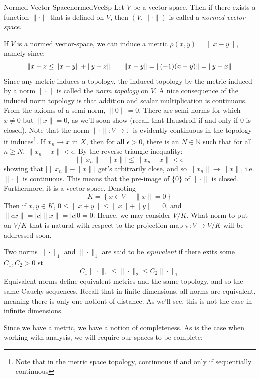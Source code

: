 \documentclass[oneside]{book}
\newcommand{\F}{\mathbb{F}}
\newcommand{\N}{\mathbb{N}}
\newcommand{\rw}{\rightarrow}
\newcommand{\set}[2]{\left\{#1 \ \middle|\ #2\right\}}
\begin{document}
\begin{defn}{Normed Vector-Space}{normedVecSp}
	Let $V$ be a vector space. Then if there exists a function $\|\cdot \|$ that is defined on $V$, then $(V,
	\|\cdot\|)$ is called a \emph{normed vector-space}.
\end{defn}

If $V$ is a normed vector-space, we can induce a metric $\rho(x,y) = \|x-y\|$, namely since:
\[
	\|x-z\\ \le \|x-y\| + \|y-z\| \qquad \|x-y\| = \|(-1)(x-y)\| = \|y-x\|
\]
Since any metric induces a topology, the induced topology by the metric induced by a norm $\|\cdot\|$ is called the
\emph{norm topology} on $V$. A nice consequence of the induced norm topology is that addition and scalar multiplication
is continuous. From the axioms of a semi-norm, $\|0\| = 0$. There are semi-norms for which $x \ne 0$ but $\|x \| = 0$, as
we'll soon show (recall that Hausdroff if and only if $0$ is closed). Note that the norm $\|\cdot\|: V \rw \F$ is evidently continuous in the topology it
induces\footnote{Note that in the metric space topology, continuous if and only if sequentially continuous}. If $x_n \rw
x$ in $X$, then for all $\epsilon > 0$, there is an $N \in \N$ such that for all $n \ge N$, $\|x_n - x\| < \epsilon$. By
the reverse
triangle inequality:
\[
	\left|\|x_n\| - \|x\|\right| \le \|x_n - x\| < \epsilon
\]
showing that $|\|x_n\| - \|x\||$ get's arbitrarily close, and so $\|x_n\| \rw \|x\|$, i.e. $\|\cdot\|$ is continuous.
This means that the pre-image of $\{0\}$ of $\|\cdot\|$ is closed. Furthermore, it is a vector-space. Denoting
\[
	K = \set{x \in V}{\|x\| = 0}
\]
Then if $x,y \in K$, $0 \le \|x+y\| \le \|x\| + \|y\| = 0$, and $\|cx\| = |c|\|x\| = |c|0 = 0$. Hence, we may consider
$V/K$. What norm to put on $V/K$ that is natural with respect to the projection map $\pi: V \rw V/K$ will be addressed
soon.

Two norms $\|\cdot\|_1$ and $\|\cdot\|_1$ are said to be \emph{equivalent} if there exits
some $C_1, C_2 > 0$ st
\[
	C_1\|\cdot\|_1 \le \|\cdot\|_2 \le C_2\|\cdot\|_1
\]
Equivalent norms define equivalent metrics and  the same topology, and so the same Cauchy sequences. Recall that
in finite dimensions, all norms are equivalent, meaning there is only one notiont of distance. As we'll see, this is not
the case in infinite dimensions.

Since we have a metric, we have a notion of completeness. As is the case when working with analysis, we will require
our spaces to be complete:
\end{document}
